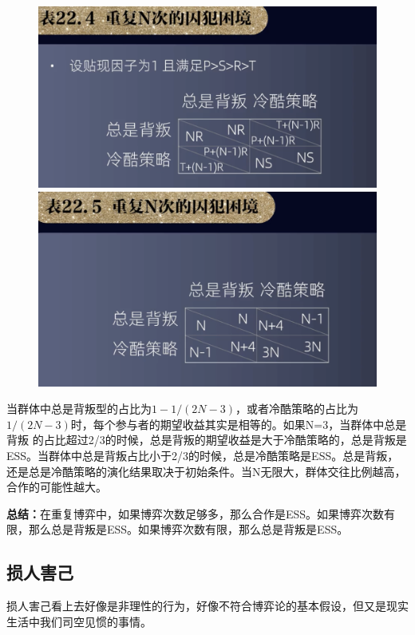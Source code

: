 \documentclass[12pt, a4paper]{article} %
\begin{document}
\begin{CJK*}{UTF8}{gbsn}
        \begin{figure}[htbp]
            \includegraphics[width=1\textwidth]{./figures/catch2023-08-05-18.37.37.png}
            \includegraphics[width=1\textwidth]{./figures/catch2023-08-05-18.38.40.png}
        \end{figure}

        当群体中总是背叛型的占比为$1-1/(2N-3)$，或者冷酷策略的占比为$1/(2N-3)$时，每个参与者的期望收益其实是相等的。如果N=3，当群体中总是背叛
        的占比超过2/3的时候，总是背叛的期望收益是大于冷酷策略的，总是背叛是ESS。当群体中总是背叛占比小于2/3的时候，总是冷酷策略是ESS。总是背叛，
        还是总是冷酷策略的演化结果取决于初始条件。当N无限大，群体交往比例越高，合作的可能性越大。\par

        \textbf{总结：}在重复博弈中，如果博弈次数足够多，那么合作是ESS。如果博弈次数有限，那么总是背叛是ESS。如果博弈次数有限，那么总是背叛是ESS。

        \subsection{损人害己}
        损人害己看上去好像是非理性的行为，好像不符合博弈论的基本假设，但又是现实生活中我们司空见惯的事情。


\end{CJK*}
\end{document}
